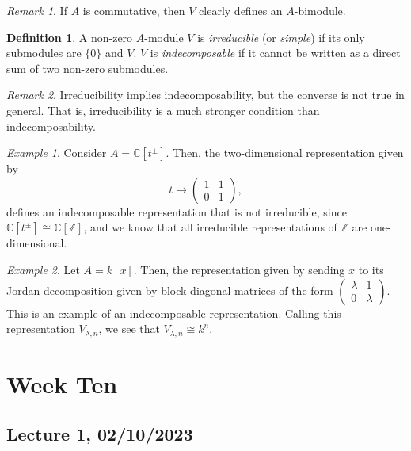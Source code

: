 \documentclass[a4paper]{report}
\theoremstyle{definition}
\newtheorem{definition}{Definition}
\theoremstyle{remark}
\newtheorem{remark}{Remark}
\theoremstyle{proposition}
\theoremstyle{conjecture}
\theoremstyle{lemma}
\theoremstyle{corollary}
\theoremstyle{exercise}
\theoremstyle{example}
\newtheorem{example}{Example}
\newcommand{\C}{\mathbb{C}}
\begin{document}
\begin{remark}
    If $A$ is commutative, then $V$ clearly defines an $A$-bimodule.
\end{remark}

\begin{definition}
    A non-zero $A$-module $V$ is \emph{irreducible} (or \emph{simple}) 
    if its only submodules are $\lbrace 0\rbrace$ and $V$.
    $V$ is \emph{indecomposable} if it cannot be written as a direct sum 
    of two non-zero submodules.
\end{definition}

\begin{remark}
    Irreducibility implies indecomposability, but the converse is not true 
    in general. That is, irreducibility is a much stronger condition than
    indecomposability.
\end{remark}

\begin{example}
    Consider $A = \C[t^\pm]$. Then, the two-dimensional representation given by 
    $$t\longmapsto \begin{pmatrix}
        1&1\\
        0&1
    \end{pmatrix},$$
    defines an indecomposable representation that is not irreducible,
    since $\C[t^\pm]\cong \C[\mathbb{Z}]$, and we know that all
    irreducible representations of $\mathbb{Z}$ are one-dimensional.
\end{example}

\begin{example}
    Let $A = k[x]$.
    Then, the representation given by sending $x$ to its Jordan decomposition
    given by block diagonal matrices of the form $\begin{pmatrix}
        \lambda & 1\\
        0 & \lambda
    \end{pmatrix}.$ This is an example of an indecomposable representation.
    Calling this representation $V_{\lambda,n}$, we see that 
    $V_{\lambda,n}\cong k^n$.
\end{example}

\chapter{Week Ten}

\section{Lecture 1, 02/10/2023} 
\end{document}
